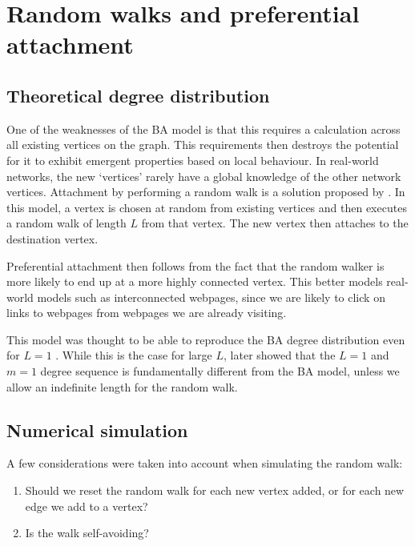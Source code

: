 \section{Random walks and preferential attachment}\label{section:random-walk}

\subsection{Theoretical degree distribution}
One of the weaknesses of the BA model is that this requires a calculation across all existing vertices on the graph. This requirements then destroys the potential for it to exhibit emergent properties based on local behaviour. In real-world networks, the new `vertices' rarely have a global knowledge of the other network vertices. Attachment by performing a random walk is a solution proposed by \citet{Saramaki2004}. In this model, a vertex is chosen at random from existing vertices and then executes a random walk of length $L$ from that vertex. The new vertex then attaches to the destination vertex. 

Preferential attachment then follows from the fact that the random walker is more likely to end up at a more highly connected vertex. This better models real-world models such as interconnected webpages, since we are likely to click on links to webpages from webpages we are already visiting. 

This model was thought to be able to reproduce the BA degree distribution even for $L=1$ \citep{Saramaki2004,J.P.Saramaki2004}. While this is the case for large $L$, \citet{Cannings2013} later showed that the $L=1$ and $m=1$ degree sequence is fundamentally different from the BA model, unless we allow an indefinite length for the random walk. 

\subsection{Numerical simulation}

A few considerations were taken into account when simulating the random walk:

\begin{enumerate}
	\item Should we reset the random walk for each new vertex added, or for each new edge we add to a vertex?
	\item Is the walk self-avoiding?
\end{enumerate}

